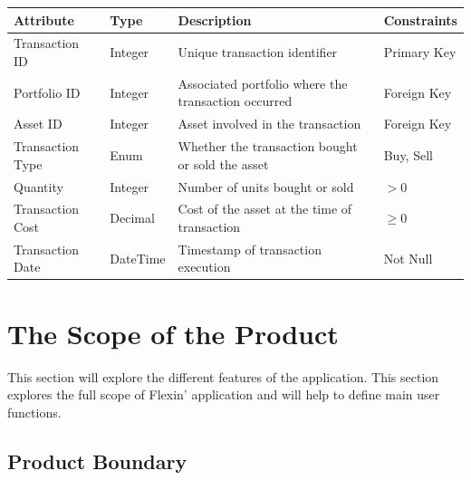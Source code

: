 \documentclass[12pt]{article}
\begin{document}
\begin{xltabular}{\textwidth}{|p{3cm}|p{2cm}|X|p{3cm}|} 
    \hline 
    \textbf{Attribute} & \textbf{Type} & \textbf{Description} & \textbf{Constraints} \\ 
    \hline 
    
    Transaction ID & Integer & Unique transaction identifier & Primary Key \\ 
    \hline 
    
    Portfolio ID & Integer & Associated portfolio where the transaction occurred & Foreign Key \\ 
    \hline 
    
    Asset ID & Integer & Asset involved in the transaction & Foreign Key \\ 
    \hline 
    
    Transaction Type & Enum & Whether the transaction bought or sold the asset & Buy, Sell \\ 
    \hline 
    
    Quantity & Integer & Number of units bought or sold & $> 0$ \\ 
    \hline 
    
    Transaction Cost & Decimal & Cost of the asset at the time of transaction & $\geq 0$ \\ 
    \hline 
    
    Transaction Date & DateTime & Timestamp of transaction execution & Not Null \\ 
    \hline 
\end{xltabular}


\section{The Scope of the Product}
This section will explore the different features of the application. This section explores the full scope of Flexin' application and will help to define main user functions.
\subsection{Product Boundary}
\end{document}
